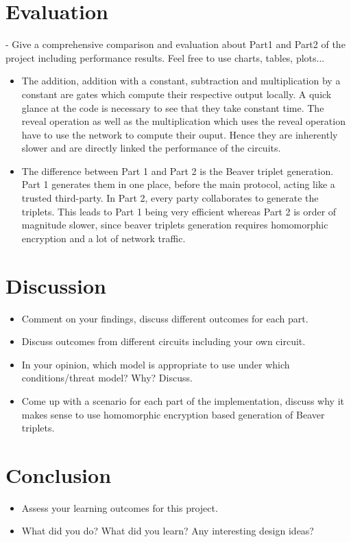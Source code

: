 \documentclass[10pt,conference]{IEEEtran}
\begin{document}
\section{Evaluation}
- Give a comprehensive comparison and evaluation about Part1 and Part2 of the project including performance results. Feel free to use charts, tables, plots...
\begin{itemize}
    \item The addition, addition with a constant, subtraction and multiplication by a constant are gates which compute their respective output locally. A quick glance at the code is necessary to see that they take constant time. The reveal operation as well as the multiplication which uses the reveal operation have to use the network to compute their ouput. Hence they are inherently slower and are directly linked the performance of the circuits.
    \item The difference between Part 1 and Part 2 is the Beaver triplet generation. Part 1 generates them in one place, before the main protocol, acting like a trusted third-party. In Part 2, every party collaborates to generate the triplets. This leads to Part 1 being very efficient whereas Part 2 is order of magnitude slower, since beaver triplets generation requires homomorphic encryption and a lot of network traffic. %
\end{itemize}

\section{Discussion}
\begin{itemize}
    \item Comment on your findings, discuss different outcomes for each part.
    \item Discuss outcomes from different circuits including your own circuit.
    \item In your opinion, which model is appropriate to use under which conditions/threat model? Why? Discuss.
    \item Come up with a scenario for each part of the implementation, discuss why it makes sense to use homomorphic encryption based generation of Beaver triplets.
\end{itemize}

\section{Conclusion}
\begin{itemize}
    \item Assess your learning outcomes for this project.
    \item What did you do? What did you learn? Any interesting design ideas? 
\end{itemize}
\end{document}

